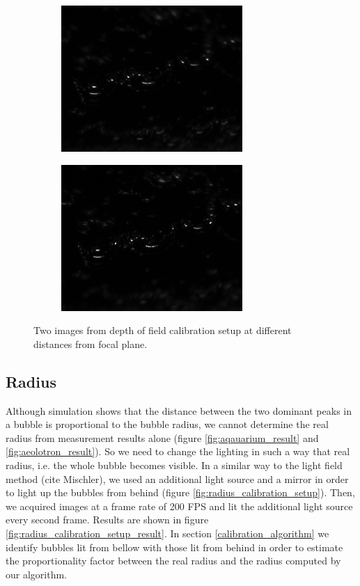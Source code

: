 			\begin{figure}
				\begin{subfigure}[b]{.55\textwidth}
					\centering
					\includegraphics[scale=.5]{images/dof_calib_1.png}
					\caption{}
				\end{subfigure}
				
				\begin{subfigure}[b]{.55\textwidth}
					\centering
					\includegraphics[scale=.5]{images/dof_calib_2.png}
					\caption{}
				\end{subfigure}
				
				\caption{Two images from depth of field calibration setup at different distances from focal plane.}								
				\label{fig:depth_of_field_setup_result}
			\end{figure}
			
			
		\subsection{Radius}\label{sub:radius_setup}
			Although simulation shows that the distance between the two dominant peaks in a bubble is proportional to the bubble radius, we cannot determine the real radius from measurement results alone (figure \ref{fig:aqauarium_result} and \ref{fig:aeolotron_result}). So we need to change the lighting in such a way that real radius, i.e. the whole bubble becomes visible. In a similar way to the light field method (cite Mischler), we used an additional light source and a mirror in order to light up the bubbles from behind (figure \ref{fig:radius_calibration_setup}). Then, we acquired images at a frame rate of 200 FPS and lit the additional light source every second frame. Results are shown in figure \ref{fig:radius_calibration_setup_result}. In section \ref{calibration_algorithm} we identify bubbles lit from bellow with those lit from behind in order to estimate the proportionality factor between the real radius and the radius computed by our algorithm. 
			
